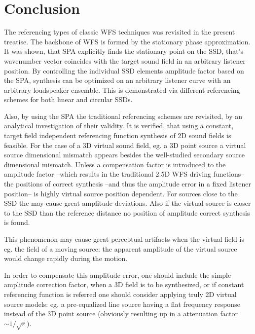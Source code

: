 \documentclass[12pt,a4paper]{article}
\begin{document}
\section{Conclusion}

The referencing types of classic WFS techniques was revisited in the present treatise. The backbone of WFS is formed by the stationary phase approximation. It was shown, that SPA explicitly finds the stationary point on the SSD, that's wavenumber vector coincides with the target sound field in an arbitrary listener position. By controlling the individual SSD elements amplitude factor based on the SPA, synthesis can be optimized on an arbitrary listener curve with an arbitrary loudspeaker ensemble. This is demonstrated via different referencing schemes for both linear and circular SSDs.

Also, by using the SPA the traditional referencing schemes are revisited, by an analytical investigation of their validity. It is verified, that using a constant, target field independent referencing function synthesis of 2D sound fields is feasible. For the case of a 3D virtual sound field, eg. a 3D point source a virtual source dimensional mismatch appears besides the well-studied secondary source dimensional mismatch. Unless a compensation factor is introduced to the amplitude factor --which results in the traditional 2.5D WFS driving functions-- the positions of correct synthesis --and thus the amplitude error in a fixed listener position-- is highly virtual source position dependent. For sources close to the SSD the may cause great amplitude deviations. Also if the virtual source is closer to the SSD than the reference distance no position of amplitude correct synthesis is found. 

This phenomenon may cause great perceptual artifacts when the virtual field is eg. the field of a moving source: the apparent amplitude of the virtual source would change rapidly during the motion.

In order to compensate this amplitude error, one should include the simple amplitude correction factor, when a 3D field is to be synthesized, or if constant referencing function is referred one should consider applying truly 2D virtual source models: eg. a pre-equalized line source having a flat frequency response instead of the 3D point source (obviously resulting up in a attenuation factor $\sim 1/\sqrt{r}$). 



\end{document}
